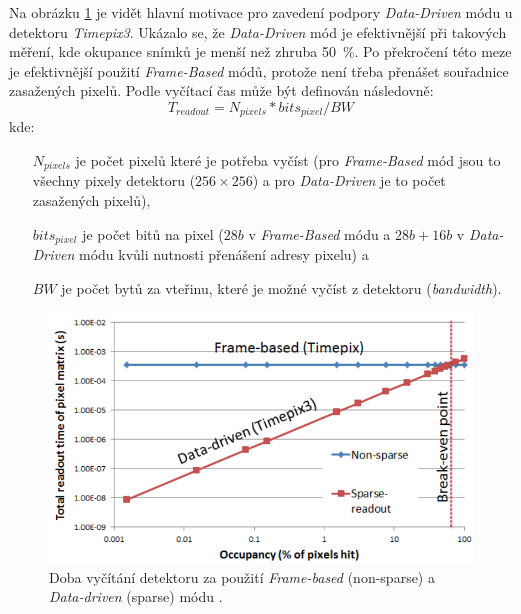 Na obrázku \ref{fig:det:frame_vs_event_driven} je vidět hlavní motivace pro zavedení podpory \textit{Data-Driven} módu u detektoru \textit{Timepix3}. Ukázalo se, že \textit{Data-Driven} mód je efektivnější při takových měření, kde okupance snímků je menší než zhruba 50~\%. Po překročení této meze je efektivnější použití \textit{Frame-Based} módů, protože není třeba přenášet souřadnice zasažených pixelů. Podle \cite{timepix3} vyčítací čas může být definován následovně:
\begin{equation}\label{eq:det:readout_time}
	T_{readout} = N_{pixels}*bits_{pixel}/BW
\end{equation}
kde:
\begin{changemargin}{1.5cm}{1cm} 
	\begin{itemize}
		\item[$N_{pixels}$] je počet pixelů které je potřeba vyčíst (pro \textit{Frame-Based} mód jsou to všechny pixely detektoru ($256\times256$) a pro \textit{Data-Driven} je to počet zasažených pixelů),
		\item[$bits_{pixel}$] je počet bitů na pixel ($28 b$ v \textit{Frame-Based} módu a $28b + 16b$ v \textit{Data-Driven} módu kvůli nutnosti přenášení adresy pixelu) a
		\item[$BW$] je počet bytů za vteřinu, které je možné vyčíst z detektoru (\textit{bandwidth}). 
	\end{itemize}
\end{changemargin}

\begin{figure}[th]
	\begin{center}
		\includegraphics[width=14cm]{figures/det_frame_vs_event_driven.png}
		\caption{Doba vyčítání detektoru za použití \textit{Frame-based} (non-sparse) a \textit{Data-driven} (sparse) módu \cite{timepix3}.}
		\label{fig:det:frame_vs_event_driven}
	\end{center}
\end{figure}

